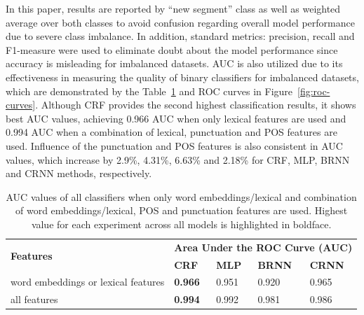 \documentclass{amia}
\begin{document}
In this paper, results are reported by ``new segment'' class as well as weighted average over both classes to avoid confusion regarding overall model performance due to severe class imbalance. In addition, standard metrics: precision, recall and F1-measure were used to eliminate doubt about the model performance since accuracy is misleading for imbalanced datasets. AUC is also utilized due to its effectiveness in measuring the quality of binary classifiers for imbalanced datasets\cite{hu2015kernelized}, which are demonstrated by the Table~\ref{tab:result_roc} and ROC curves in Figure~\ref{fig:roc-curves}. Although CRF provides the second highest classification results, it shows best AUC values, achieving 0.966 AUC when only lexical features are used and 0.994 AUC when a combination of lexical, punctuation and POS features are used. Influence of the punctuation and POS features is also consistent in AUC values, which increase by 2.9\%, 4.31\%, 6.63\% and 2.18\% for CRF, MLP, BRNN and CRNN methods, respectively. \\ 

\begin{table}[ht]
\centering
\caption{AUC values of all classifiers when only word embeddings/lexical and combination of word embeddings/lexical, POS and punctuation features are used. Highest value for each experiment across all models is highlighted in boldface.}
\label{tab:result_roc}
 \begin{tabular}{|l|l|l|l|l|}
  \hline
\multirow{2}{*}{\textbf{Features}} & \multicolumn{4}{|c|}{\textbf{Area Under the ROC Curve (AUC)}} \\\cline{2-5}
 & \textbf{CRF} & \textbf{MLP}  & \textbf{BRNN} & \textbf{CRNN} \\ \hline      
 word embeddings or lexical features & \textbf{0.966} & 0.951 & 0.920 & 0.965 \\ \hline
 all features & \textbf{0.994} & 0.992 & 0.981 & 0.986 \\ \hline
  \end{tabular}
\end{table}      

\end{document}
